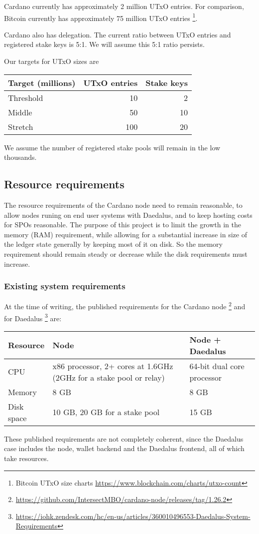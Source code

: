 \documentclass[11pt,a4paper]{article}
\begin{document}
Cardano currently has approximately 2 million UTxO entries. For comparison,
Bitcoin currently has approximately 75 million UTxO entries%
\footnote{Bitcoin UTxO size charts \url{https://www.blockchain.com/charts/utxo-count}}.

Cardano also has delegation. The current ratio between UTxO entries
and registered stake keys is 5:1. We will assume this 5:1 ratio persists.

Our targets for UTxO sizes are

\begin{center}
\begin{tabular}[]{lrr}
  Target (millions) & UTxO entries & Stake keys \\
  \toprule
  Threshold &  10  &  2 \\
  Middle    &  50  & 10 \\
  Stretch   & 100  & 20
\end{tabular}
\end{center}

We assume the number of registered stake pools will remain in the low thousands.

\subsection{Resource requirements}
\label{resource-requirements}

The resource requirements of the Cardano node need to remain reasonable, to
allow nodes runing on end user systems with Daedalus, and to keep hosting costs
for SPOs reasonable. The purpose of this project is to limit the growth in the
memory (RAM) requirement, while allowing for a substantial increase in size of
the ledger state generally by keeping most of it on disk. So the memory
requirement should remain steady or decrease while the disk requirements must
increase.

\subsubsection{Existing system requirements}

At the time of writing, the published requirements for the Cardano node%
\footnote{\url{https://github.com/IntersectMBO/cardano-node/releases/tag/1.26.2}}
and for Daedalus%
\footnote{\url{https://iohk.zendesk.com/hc/en-us/articles/360010496553-Daedalus-System-Requirements}}
are:

\begin{center}
\begin{tabular}[]{lp{6cm}p{5cm}}
  Resource    & Node & Node + Daedalus \\
  \toprule
  CPU         &  x86 processor, 2+ cores at 1.6GHz (2GHz for a stake pool or relay)  & 64-bit dual core processor \\
  Memory      &  8 GB  & 8 GB \\
  Disk space  & 10 GB, 20 GB for a stake pool & 15 GB
\end{tabular}
\end{center}
These published requirements are not completely coherent, since the Daedalus
case includes the node, wallet backend and the Daedalus frontend, all of which
take resources.
\end{document}
